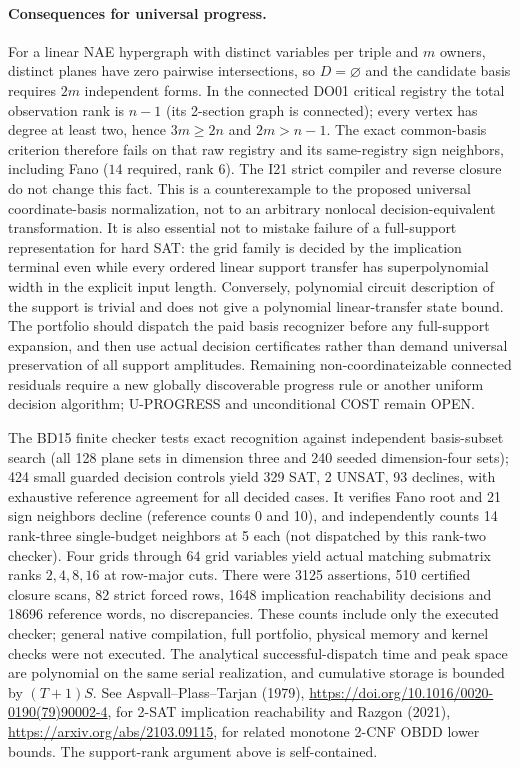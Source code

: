 \documentclass[11pt]{article}
\begin{document}
\paragraph{Consequences for universal progress.}
For a linear NAE hypergraph with distinct variables per triple and $m$ owners, distinct planes have zero pairwise intersections, so $D=\varnothing$ and the candidate basis requires $2m$ independent forms. In the connected DO01 critical registry the total observation rank is $n-1$ (its 2-section graph is connected); every vertex has degree at least two, hence $3m\ge2n$ and $2m>n-1$. The exact common-basis criterion therefore fails on that raw registry and its same-registry sign neighbors, including Fano ($14$ required, rank $6$). The I21 strict compiler and reverse closure do not change this fact. This is a counterexample to the proposed universal coordinate-basis normalization, not to an arbitrary nonlocal decision-equivalent transformation. It is also essential not to mistake failure of a full-support representation for hard SAT: the grid family is decided by the implication terminal even while every ordered linear support transfer has superpolynomial width in the explicit input length. Conversely, polynomial circuit description of the support is trivial and does not give a polynomial linear-transfer state bound. The portfolio should dispatch the paid basis recognizer before any full-support expansion, and then use actual decision certificates rather than demand universal preservation of all support amplitudes. Remaining non-coordinateizable connected residuals require a new globally discoverable progress rule or another uniform decision algorithm; U-PROGRESS and unconditional COST remain OPEN.

The BD15 finite checker tests exact recognition against independent basis-subset search (all 128 plane sets in dimension three and 240 seeded dimension-four sets); 424 small guarded decision controls yield 329 SAT, 2 UNSAT, 93 declines, with exhaustive reference agreement for all decided cases. It verifies Fano root and 21 sign neighbors decline (reference counts 0 and 10), and independently counts 14 rank-three single-budget neighbors at 5 each (not dispatched by this rank-two checker). Four grids through $64$ grid variables yield actual matching submatrix ranks $2,4,8,16$ at row-major cuts. There were 3125 assertions, 510 certified closure scans, 82 strict forced rows, 1648 implication reachability decisions and 18696 reference words, no discrepancies. These counts include only the executed checker; general native compilation, full portfolio, physical memory and kernel checks were not executed. The analytical successful-dispatch time and peak space are polynomial on the same serial realization, and cumulative storage is bounded by $(T+1)S$. See Aspvall--Plass--Tarjan (1979), \url{https://doi.org/10.1016/0020-0190(79)90002-4}, for 2-SAT implication reachability and Razgon (2021), \url{https://arxiv.org/abs/2103.09115}, for related monotone 2-CNF OBDD lower bounds. The support-rank argument above is self-contained.
\end{document}
